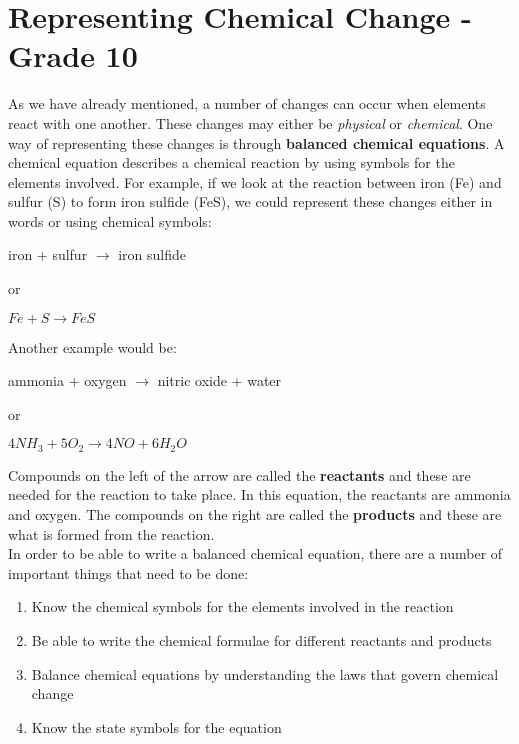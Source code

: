



\chapter{Representing Chemical Change - Grade 10}
\label{repchange}

As we have already mentioned, a number of changes can occur when elements react with one another. These changes may either be \textit{physical} or \textit{chemical}. One way of representing these changes is through \textbf{balanced chemical equations}. A chemical equation describes a chemical reaction by using symbols for the elements involved. For example, if we look at the reaction between iron (Fe) and sulfur (S) to form iron sulfide (FeS), we could represent these changes either in words or using chemical symbols:

\begin{center}
iron + sulfur \rm${\rightarrow}$ iron sulfide

or

\rm${Fe + S \rightarrow FeS}$
\end{center}

Another example would be:

\begin{center}
ammonia + oxygen \rm${\rightarrow}$ nitric oxide + water

or

\rm${4NH_{3} + 5O_{2} \rightarrow 4NO + 6H_{2}O}$
\end{center}

Compounds on the left of the arrow are called the \textbf{reactants} and these are needed for the reaction to take place. In this equation, the reactants are ammonia and oxygen. The compounds on the right are called the \textbf{products} and these are what is formed from the reaction. \\ 

In order to be able to write a balanced chemical equation, there are a number of important things that need to be done: 

\begin{enumerate}
\item{Know the chemical symbols for the elements involved in the reaction}
\item{Be able to write the chemical formulae for different reactants and products}
\item{Balance chemical equations by understanding the laws that govern chemical change}
\item{Know the state symbols for the equation}
\end{enumerate}

